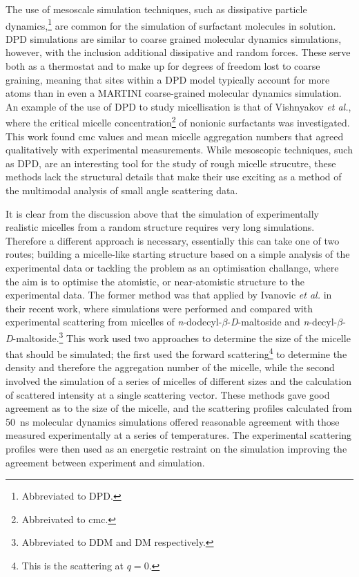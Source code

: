 The use of mesoscale simulation techniques, such as dissipative particle dynamics,\footnote{Abbreviated to DPD.} are common for the simulation of surfactant molecules in solution.\autocite{shelley_computer_2000}
DPD simulations are similar to coarse grained molecular dynamics simulations, however, with the inclusion additional dissipative and random forces.
These serve both as a thermostat and to make up for degrees of freedom lost to coarse graining, meaning that sites within a DPD model typically account for more atoms than in even a MARTINI coarse-grained molecular dynamics simulation.
An example of the use of DPD to study micellisation is that of Vishnyakov \emph{et al.},\autocite{vishnyakov_prediction_2013} where the critical micelle concentration\footnote{Abbreivated to cmc.} of nonionic surfactants was investigated.
This work found cmc values and mean micelle aggregation numbers that agreed qualitatively with experimental measurements.
While mesoscopic techniques, such as DPD, are an interesting tool for the study of rough micelle strucutre, these methods lack the structural details that make their use exciting as a method of the multimodal analysis of small angle scattering data.

It is clear from the discussion above that the simulation of experimentally realistic micelles from a random structure requires very long simulations.
Therefore a different approach is necessary, essentially this can take one of two routes; building a micelle-like starting structure based on a simple analysis of the experimental data or tackling the problem as an optimisation challange, where the aim is to optimise the atomistic, or near-atomistic structure to the experimental data.
The former method was that applied by Ivanovic \emph{et al.} in their recent work,\autocite{ivanovic_temperature-dependent_2018} where simulations were performed and compared with experimental scattering from micelles of \emph{n}-dodecyl-$\beta$-\emph{D}-maltoside and \emph{n}-decyl-$\beta$-\emph{D}-maltoside.\footnote{Abbreviated to DDM and DM respectively.}
This work used two approaches to determine the size of the micelle that should be simulated; the first used the forward scattering\footnote{This is the scattering at $q=0$.} to determine the density and therefore the aggregation number of the micelle,\autocite{lipfert_size_2007} while the second involved the simulation of a series of micelles of different sizes and the calculation of scattered intensity at a single scattering vector.
These methods gave good agreement as to the size of the micelle, and the scattering profiles calculated from \SI{50}{\nano\second} molecular dynamics simulations offered reasonable agreement with those measured experimentally at a series of temperatures.
The experimental scattering profiles were then used as an energetic restraint on the simulation improving the agreement between experiment and simulation.

